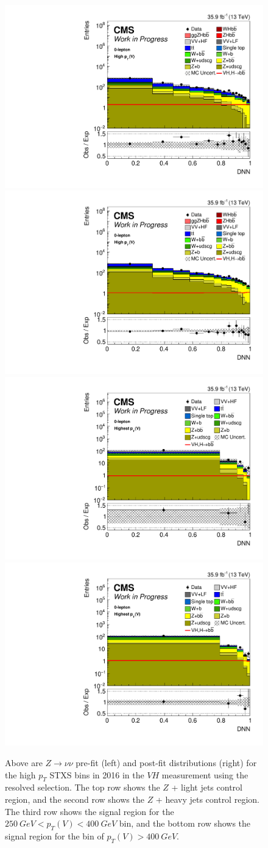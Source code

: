 \begin{figure}
  \includegraphics[width=0.35\linewidth]{figures/210322_STXSfine_400split_unblinded_Xbb_025349b6_postfitplots/plot_shapes_vhbb_Znn_21_13TeV2016_prefit_logy.pdf}
  \includegraphics[width=0.35\linewidth]{figures/210322_STXSfine_400split_unblinded_Xbb_025349b6_postfitplots/plot_shapes_vhbb_Znn_21_13TeV2016_postfit_logy.pdf} \\
  \includegraphics[width=0.35\linewidth]{figures/210322_STXSfine_400split_unblinded_Xbb_025349b6_postfitplots/plot_shapes_vhbb_Znn_23_13TeV2016_prefit_logy.pdf}
  \includegraphics[width=0.35\linewidth]{figures/210322_STXSfine_400split_unblinded_Xbb_025349b6_postfitplots/plot_shapes_vhbb_Znn_23_13TeV2016_postfit_logy.pdf} \\
  \caption[$Z\rightarrow \nu\nu$ $V\!H$ distributions for high $p_T$ in 2016]{
    Above are $Z\rightarrow \nu\nu$ pre-fit (left) and post-fit distributions (right)
    for the high $p_T$ STXS bins in 2016 in the $V\!H$ measurement using the resolved selection.
    The top row shows the $Z$ + light jets control region, and
    the second row shows the $Z$ + heavy jets control region.
    The third row shows the signal region for the $\SI{250}{GeV} < p_T(V) < \SI{400}{GeV}$ bin,
    and the bottom row shows the signal region for the bin of $p_T(V) > \SI{400}{GeV}$.
  }
  \label{fig:vh-znn-high-2016}
\end{figure}
